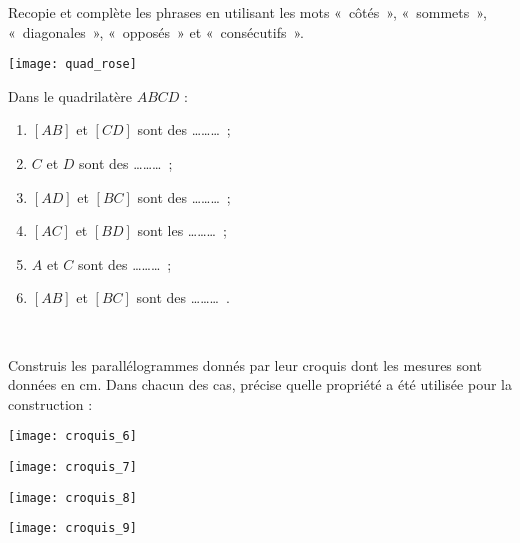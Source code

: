 
\begin{exercice}
Recopie et complète les phrases en utilisant les mots « côtés », « sommets », « diagonales », « opposés » et « consécutifs ».\\[-3em]
\begin{minipage}[c]{0.26\linewidth}
\vspace{2cm}
 \texttt{[image: quad\_rose]}
 \end{minipage} \hfill%
 \begin{minipage}[t]{0.66\linewidth}
 Dans le quadrilatère $ABCD$ :
 \begin{enumerate}
  \item $[AB]$ et $[CD]$ sont des \ldots \ldots \ldots ;
  \item $C$ et $D$ sont des \ldots \ldots \ldots ;
  \item $[AD]$ et $[BC]$ sont des \ldots \ldots \ldots ;
  \item $[AC]$ et $[BD]$ sont les \ldots \ldots \ldots ;
  \item $A$ et $C$ sont des \ldots \ldots \ldots ;
  \item $[AB]$ et $[BC]$ sont des \ldots \ldots \ldots .
  \end{enumerate}
 \end{minipage} \\
\end{exercice}





\begin{exercice}
Construis les parallélogrammes donnés par leur croquis dont les mesures sont données en cm. Dans chacun des cas, précise quelle propriété a été utilisée pour la construction :
\begin{colenumerate}{2}
 \item
 
 \texttt{[image: croquis\_6]}
  \item
 
 \texttt{[image: croquis\_7]}
  \item
 
 \texttt{[image: croquis\_8]}
  \item
 
 \texttt{[image: croquis\_9]}
 \end{colenumerate}
\end{exercice}


